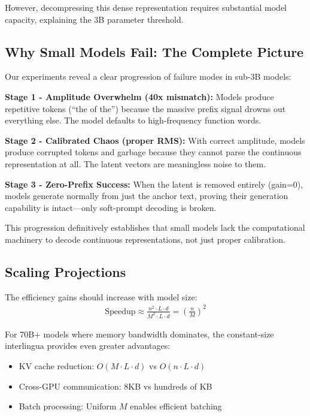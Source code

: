 \documentclass{article}
\begin{document}
However, decompressing this dense representation requires substantial model capacity, explaining the 3B parameter threshold.

\subsection{Why Small Models Fail: The Complete Picture}

Our experiments reveal a clear progression of failure modes in sub-3B models:

\textbf{Stage 1 - Amplitude Overwhelm (40x mismatch):} Models produce repetitive tokens (``the of the'') because the massive prefix signal drowns out everything else. The model defaults to high-frequency function words.

\textbf{Stage 2 - Calibrated Chaos (proper RMS):} With correct amplitude, models produce corrupted tokens and garbage because they cannot parse the continuous representation at all. The latent vectors are meaningless noise to them.

\textbf{Stage 3 - Zero-Prefix Success:} When the latent is removed entirely (gain=0), models generate normally from just the anchor text, proving their generation capability is intact—only soft-prompt decoding is broken.

This progression definitively establishes that small models lack the computational machinery to decode continuous representations, not just proper calibration.

\subsection{Scaling Projections}

The efficiency gains should increase with model size:
\begin{align}
\text{Speedup} \approx \frac{n^2 \cdot L \cdot d}{M^2 \cdot L \cdot d} = \left(\frac{n}{M}\right)^2
\end{align}

For 70B+ models where memory bandwidth dominates, the constant-size interlingua provides even greater advantages:
\begin{itemize}
\item KV cache reduction: $O(M \cdot L \cdot d)$ vs $O(n \cdot L \cdot d)$
\item Cross-GPU communication: 8KB vs hundreds of KB
\item Batch processing: Uniform $M$ enables efficient batching
\end{itemize}
\end{document}
